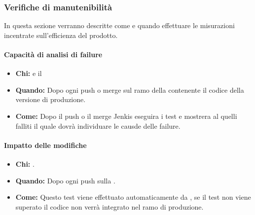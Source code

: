 \newpage
\subsubsection{Verifiche di manutenibilità}
In questa sezione verranno descritte come e quando effettuare le misurazioni incentrate sull'efficienza del prodotto.

\paragraph{Capacità di analisi di failure}
\begin{itemize}
\item \textbf{Chi:}  e il \Prog
\item \textbf{Quando:} Dopo ogni push o merge sul ramo della  contenente il codice della versione di produzione.
\item \textbf{Come:} Dopo il push o il merge Jenkis eseguira i test e mostrera al \Prog quelli falliti il quale dovrà individuare le causde delle failure.
\end{itemize}

\paragraph{Impatto delle modifiche}
\begin{itemize}
\item \textbf{Chi:} .
\item \textbf{Quando:} Dopo ogni push sulla .
\item \textbf{Come:} Questo test viene effettuato automaticamente da , se il test non viene superato il codice non verrà integrato nel ramo di produzione.
\end{itemize}
